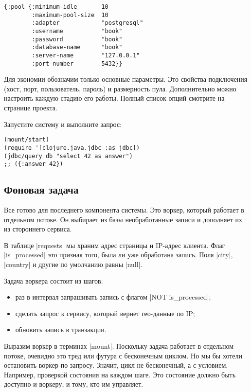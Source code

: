 \begin{verbatim}
{:pool {:minimum-idle       10
        :maximum-pool-size  10
        :adapter            "postgresql"
        :username           "book"
        :password           "book"
        :database-name      "book"
        :server-name        "127.0.0.1"
        :port-number        5432}}
\end{verbatim}

Для экономии обозначим только основные параметры. Это свойства подключения
(хост, порт, пользователь, пароль) и размерность пула. Дополнительно можно
настроить каждую стадию его работы. Полный список опций смотрите на странице
проекта.

Запустите систему и выполните запрос:

\begin{verbatim}
(mount/start)
(require '[clojure.java.jdbc :as jdbc])
(jdbc/query db "select 42 as answer")
;; ({:answer 42})
\end{verbatim}

\subsection{Фоновая задача}

Все готово для последнего компонента системы. Это воркер, который работает в
отдельном потоке. Он выбирает из базы необработанные записи и дополняет их из
стороннего сервиса.

В таблице \spverb|requests| мы храним адрес страницы и IP-адрес клиента. Флаг
\spverb|is_processed| это признак того, была ли уже обработана запись. Поля
\spverb|city|, \spverb|country| и другие по умолчанию равны \spverb|null|.

Задача воркера состоит из шагов:

\begin{itemize}

\item
  раз в интервал запрашивать запись с флагом \spverb|NOT is_processed|;

\item
  сделать запрос к сервису, который вернет гео-данные по IP;

\item
  обновить запись в транзакции.

\end{itemize}

Выразим воркер в терминах \spverb|mount|. Поскольку задача работает в отдельном
потоке, очевидно это тред или футура с бесконечным циклом. Но мы бы хотели
остановить воркер по запросу. Значит, цикл не бесконечный, а с
условием. Например, проверкой состояния на каждом шаге. Это состояние должно
быть доступно и воркеру, и тому, кто им управляет.

